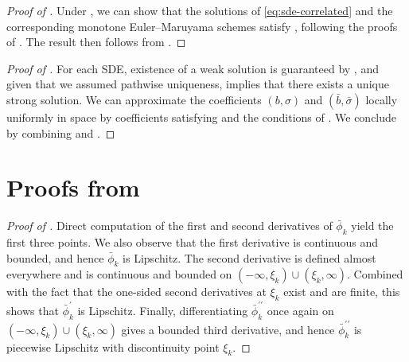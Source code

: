 \documentclass[onseside, final]{amsart}
\theoremstyle{definition}
\numberwithin{equation}{section}
\begin{document}
	\begin{proof}[Proof of ]
		Under , we can show that the solutions of \eqref{eq:sde-correlated} and the corresponding monotone Euler--Maruyama schemes satisfy , following the proofs of  \cite[Lemma 3.14, Lemma 3.15, Proposition 3.16]{BaKaRo22}. The result then follows from .
	\end{proof}
	
	\begin{proof}[Proof of ]
		For each SDE, existence of a weak solution is guaranteed by \citet[Chapter 3, Section 3]{Sk65}, and given that we assumed pathwise uniqueness, \citet[Corollary 1]{YW} implies that there exists a unique strong solution. We can approximate the coefficients $(b, \sigma)$ and $(\bar b, \bar \sigma)$ locally uniformly in space by coefficients satisfying  and the conditions of . We conclude by combining  and .
	\end{proof}
	
\section{Proofs from }\label{app:proofs-transform}

	\begin{proof}[Proof of ]
		Direct computation of the first and second derivatives of $\bar \phi_k$ yield the first three points. We also observe that the first derivative is continuous and bounded, and hence $\bar \phi_k$ is Lipschitz. The second derivative is defined almost everywhere and is continuous and bounded on $(- \infty, \xi_k) \cup (\xi_k, \infty)$. Combined with the fact that the one-sided second derivatives at $\xi_k$ exist and are finite, this shows that $\bar \phi_k^\prime$ is Lipschitz. Finally, differentiating $\bar \phi_k^{\prime \prime}$ once again on $(- \infty, \xi_k) \cup (\xi_k, \infty)$ gives a bounded third derivative, and hence $\bar \phi_k^{\prime \prime}$ is piecewise Lipschitz with discontinuity point $\xi_k$.
	\end{proof}
	
\end{document}

